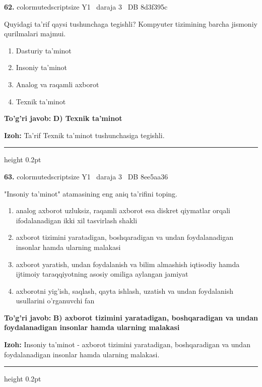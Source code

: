 \documentclass[10pt,a4paper,oneside]{article}
\begin{document}
\noindent\textbf{\color{ink}62.}  {color{muted}scriptsize Y1 \textbullet\ daraja 3 \textbullet\ DB 8d3f395c}
\par
Quyidagi ta'rif qaysi tushunchaga tegishli? Kompyuter tizimining barcha jismoniy qurilmalari majmui.
\begin{enumerate}[label=\Alph*),leftmargin=9mm]
\item Dasturiy ta'minot
\item Insoniy ta'minot
\item Analog va raqamli axborot
\item Texnik ta'minot
\end{enumerate}
\begin{tcolorbox}[enhanced,breakable,colback=teal!4,colframe=teal!50!black,boxrule=0.5pt,arc=1.1mm,left=3mm,right=3mm,top=1.7mm,bottom=1.7mm,before skip=2mm,after skip=2mm]
\textbf{\color{teal}To'g'ri javob:} \textbf{D) Texnik ta'minot}
\par\smallskip
\textbf{Izoh:} Ta'rif Texnik ta'minot tushunchasiga tegishli.
\end{tcolorbox}
\vspace{2mm}\hrule height 0.2pt \vspace{3mm}

\noindent\textbf{\color{ink}63.}  {color{muted}scriptsize Y1 \textbullet\ daraja 3 \textbullet\ DB 8ee5aa36}
\par
"Insoniy ta'minot" atamasining eng aniq ta'rifini toping.
\begin{enumerate}[label=\Alph*),leftmargin=9mm]
\item analog axborot uzluksiz, raqamli axborot esa diskret qiymatlar orqali ifodalanadigan ikki xil tasvirlash shakli
\item axborot tizimini yaratadigan, boshqaradigan va undan foydalanadigan insonlar hamda ularning malakasi
\item axborot yaratish, undan foydalanish va bilim almashish iqtisodiy hamda ijtimoiy taraqqiyotning asosiy omiliga aylangan jamiyat
\item axborotni yig'ish, saqlash, qayta ishlash, uzatish va undan foydalanish usullarini o'rganuvchi fan
\end{enumerate}
\begin{tcolorbox}[enhanced,breakable,colback=teal!4,colframe=teal!50!black,boxrule=0.5pt,arc=1.1mm,left=3mm,right=3mm,top=1.7mm,bottom=1.7mm,before skip=2mm,after skip=2mm]
\textbf{\color{teal}To'g'ri javob:} \textbf{B) axborot tizimini yaratadigan, boshqaradigan va undan foydalanadigan insonlar hamda ularning malakasi}
\par\smallskip
\textbf{Izoh:} Insoniy ta'minot - axborot tizimini yaratadigan, boshqaradigan va undan foydalanadigan insonlar hamda ularning malakasi.
\end{tcolorbox}
\vspace{2mm}\hrule height 0.2pt \vspace{3mm}
\end{document}

